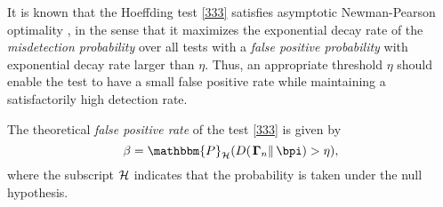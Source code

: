\documentclass[10pt, twocolumn]{IEEEtran}
\begin{document}
{It is known that the Hoeffding test \eqref{333} satisfies
  asymptotic Newman-Pearson optimality
  \cite{pas-sma-ton-09,robust-anomaly-tcns}, in the sense that it
  maximizes the exponential decay rate of the \textit{misdetection
    probability} over all tests with a \textit{false positive
    probability} with exponential decay rate larger than $\eta$. Thus,
  an appropriate threshold $\eta$ should enable the test to have a small
  false positive rate while maintaining a satisfactorily high detection
  rate.}

{The theoretical \textit{false positive rate} \cite{TIT13}
of the test \eqref{333} is given by
\begin{equation}
{\beta} = {\mathbbm{P}_{\cal H}}( {D( {\left. {{\boldsymbol{\Gamma}
          _n}} \right\|{{\bpi}}} ) > \eta }),  \label{334}
\end{equation}
where the subscript $\cal H$ indicates that the probability is taken
under the null hypothesis.}
\end{document}
